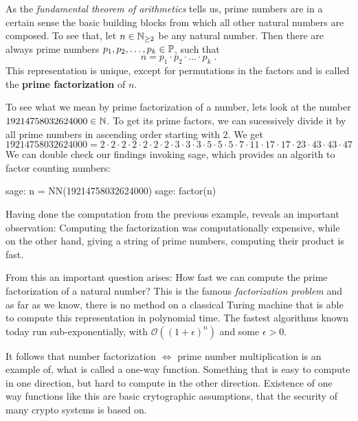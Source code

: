 As the \textit{fundamental theorem of arithmetics} tells us, prime numbers are in a certain sense the basic building blocks from which all other natural numbers are composed. To see that, let $ n \in \mathbb{N}_{\geq 2} $ be any natural number. Then there are always prime numbers $ p_1, p_2, \ldots, p_k \in \mathbb{P} $, such that
\begin{equation}
n = p_1 \cdot p_2 \cdot \ldots \cdot p_k \;.
\end{equation}
This representation is unique, except for permutations in the factors and is called the \textbf{prime factorization} of $n$.
\begin{example} To see what we mean by prime factorization of a number, lets look at the number $19214758032624000\in\mathbb{N}$. To get its prime factors, we can sucessively divide it by all prime numbers in ascending order starting with $2$. We get
\begin{equation*}
19214758032624000 = 2\cdot 2\cdot 2\cdot 2\cdot 2\cdot 2\cdot 2 \cdot 3\cdot 3\cdot 3\cdot 5\cdot 5\cdot 5\cdot 7 \cdot 11 \cdot 17\cdot 17 \cdot 23 \cdot 43\cdot 43 \cdot 47
\end{equation*}
We can double check our findings invoking sage, which provides an algorith to factor counting numbers:
\begin{sagecommandline}
sage: n = NN(19214758032624000)
sage: factor(n)
\end{sagecommandline}
\end{example}
Having done the computation from the previous example, reveals an important observation: Computing the factorization was computationally expensive, while on the other hand, giving a string of prime numbers, computing their product is fast. 

From this an important question arises: How fast we can compute the prime factorization of a natural number? This is the famous \textit{factorization problem} and as far as we know, there is no method on a classical Turing machine that is able to compute this representation in polynomial time. The fastest algorithms known today run sub-exponentially, with $\mathcal{O}((1+ \epsilon)^n)$ and some $ \epsilon> 0 $.

It follows that number factorization $\Leftrightarrow$ prime number multiplication is an example of, what is called a one-way function. Something that is easy to compute in one direction, but hard to compute in the other direction. Existence of one way functions like this are basic crytographic assumptions, that the security of many crypto systems is based on.

